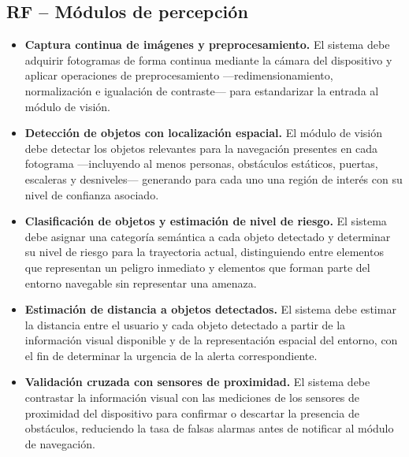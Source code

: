 \subsection*{RF -- Módulos de percepción}

\begin{itemize}

    \item[\textbf{RF-07}] \textbf{Captura continua de imágenes y preprocesamiento.}
    El sistema debe adquirir fotogramas de forma continua mediante la cámara del dispositivo
    y aplicar operaciones de preprocesamiento ---redimensionamiento, normalización e
    igualación de contraste--- para estandarizar la entrada al módulo de visión.

    \item[\textbf{RF-08}] \textbf{Detección de objetos con localización espacial.}
    El módulo de visión debe detectar los objetos relevantes para la navegación presentes en
    cada fotograma ---incluyendo al menos personas, obstáculos estáticos, puertas, escaleras
    y desniveles--- generando para cada uno una región de interés con su nivel de confianza
    asociado.

    \item[\textbf{RF-09}] \textbf{Clasificación de objetos y estimación de nivel de riesgo.}
    El sistema debe asignar una categoría semántica a cada objeto detectado y determinar su
    nivel de riesgo para la trayectoria actual, distinguiendo entre elementos que representan
    un peligro inmediato y elementos que forman parte del entorno navegable sin representar
    una amenaza.

    \item[\textbf{RF-10}] \textbf{Estimación de distancia a objetos detectados.}
    El sistema debe estimar la distancia entre el usuario y cada objeto detectado a partir
    de la información visual disponible y de la representación espacial del entorno, con el
    fin de determinar la urgencia de la alerta correspondiente.

    \item[\textbf{RF-11}] \textbf{Validación cruzada con sensores de proximidad.}
    El sistema debe contrastar la información visual con las mediciones de los sensores de
    proximidad del dispositivo para confirmar o descartar la presencia de obstáculos,
    reduciendo la tasa de falsas alarmas antes de notificar al módulo de navegación.


\end{itemize}
